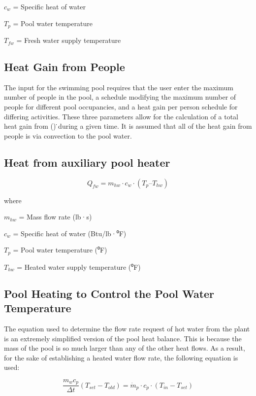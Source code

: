 \(c_w\) = Specific heat of water

\(T_p\) = Pool water temperature

\(T_{fw}\) = Fresh water supply temperature

\subsection{Heat Gain from People}\label{heat-gain-from-people}

The input for the swimming pool requires that the user enter the maximum number of people in the pool, a schedule modifying the maximum number of people for different pool occupancies, and a heat gain per person schedule for differing activities. These three parameters allow for the calculation of a total heat gain from () ̇during a given time. It is assumed that all of the heat gain from people is via convection to the pool water.

\subsection{Heat from auxiliary pool heater}\label{heat-from-auxiliary-pool-heater}

\begin{equation}
Q_{fw} = m_{hw} \cdot c_w \cdot (T_p – T_{hw})
\end{equation}

where

\(m_{hw}\) = Mass flow rate (lb·s)

\(c_w\) = Specific heat of water (Btu/lb·⁰F)

\(T_p\) = Pool water temperature (⁰F)

\(T_{hw}\) = Heated water supply temperature (⁰F)

\subsection{Pool Heating to Control the Pool Water Temperature}\label{pool-heating-to-control-the-pool-water-temperature}

The equation used to determine the flow rate request of hot water from the plant is an extremely simplified version of the pool heat balance. This is because the mass of the pool is so much larger than any of the other heat flows. As a result, for the sake of establishing a heated water flow rate, the following equation is used:

\begin{equation}
\frac{m_w c_p}{\Delta t} (T_{set}-T_{old}) = \dot{m}_p \cdot c_p \cdot (T_{in} - T_{set} )
\end{equation}


